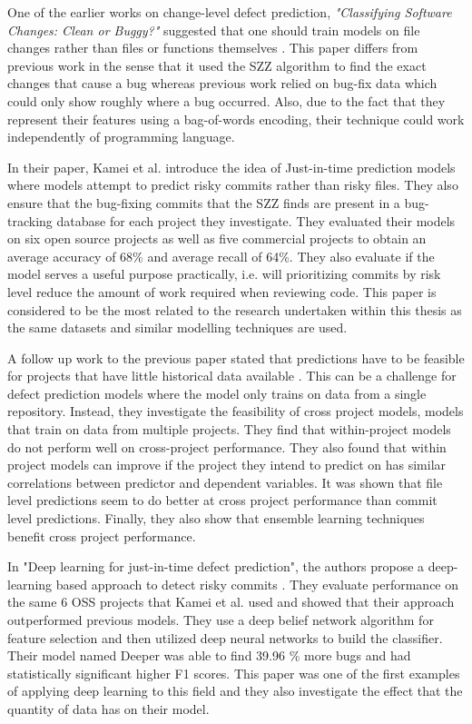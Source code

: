 \documentclass[../main.tex]{subfiles}
\begin{document}
One of the earlier works on change-level defect prediction, \textit{"Classifying Software Changes: Clean or Buggy?"} suggested that one should train models on file changes rather than files or functions themselves \cite{kim2008classifying}. This paper differs from previous work in the sense that it used the SZZ algorithm to find the exact changes that cause a bug whereas previous work relied on bug-fix data which could only show roughly where a bug occurred. Also, due to the fact that they represent their features using a bag-of-words encoding, their technique could work independently of programming language. 

In their paper, Kamei et al. \cite{kamei2013large} introduce the idea of Just-in-time prediction models where models attempt to predict risky commits rather than risky files. They also ensure that the bug-fixing commits that the SZZ finds are present in a bug-tracking database for each project they investigate. They evaluated their models on six open source projects as well as five commercial projects to obtain an average accuracy of 68\% and average recall of 64\%. They also evaluate if the model serves a useful purpose practically, i.e. will prioritizing commits by risk level reduce the amount of work required when reviewing code. This paper is considered to be the most related to the research undertaken within this thesis as the same datasets and similar modelling techniques are used. 

A follow up work to the previous paper stated that predictions have to be feasible for projects that have little historical data available \cite{fukushima2014empirical}. This can be a challenge for defect prediction models where the model only trains on data from a single repository. Instead, they investigate the feasibility of cross project models, models that train on data from multiple projects. They find that within-project models do not perform well on cross-project performance. They also found that within project models can improve if the project they intend to predict on has similar correlations between predictor and dependent variables. It was shown that file level predictions seem to do better at cross project performance than commit level predictions. Finally, they also show that ensemble learning techniques benefit cross project performance. 

In "Deep learning for just-in-time defect prediction", the authors propose a deep-learning based approach to detect risky commits \cite{yang2015deep}. They evaluate performance on the same 6 OSS projects that Kamei et al. used and showed that their approach outperformed previous models. They use a deep belief network algorithm for feature selection and then utilized deep neural networks to build the classifier. Their model named Deeper was able to find 39.96 \% more bugs and had statistically significant higher F1 scores. This paper was one of the first examples of applying deep learning to this field and they also investigate the effect that the quantity of data has on their model.
\end{document}
